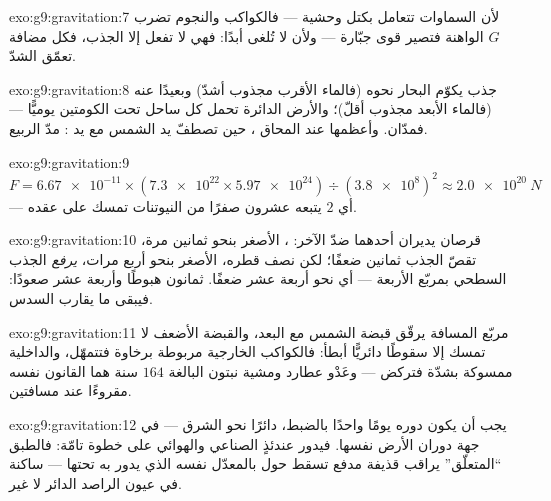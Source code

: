 \begin{solution}{exo:g9:gravitation:7}
لأن السماوات تتعامل بكتل وحشية --- فالكواكب والنجوم تضرب $G$
الواهنة فتصير قوى جبّارة --- ولأن  لا تُلغى أبدًا:
فهي لا تفعل إلا الجذب، فكل  مضافة تعمّق الشدّ.
\end{solution}

\begin{solution}{exo:g9:gravitation:8}
جذب  يكوّم البحار نحوه (فالماء الأقرب مجذوب أشدّ) وبعيدًا
عنه (فالماء الأبعد مجذوب أقلّ)؛ والأرض الدائرة تحمل كل ساحل
تحت الكومتين يوميًّا --- فمدّان. وأعظمها عند المحاق ،
حين تصطفّ يد الشمس مع يد : مدّ الربيع.
\end{solution}

\begin{solution}{exo:g9:gravitation:9}
$F = \num{6.67e-11} \times (\num{7.3e22} \times
\num{5.97e24}) \div (\num{3.8e8})^2 \approx \qty{2.0e20}{N}$
--- أي $2$ يتبعه عشرون صفرًا من النيوتنات تمسك  على
عقده.
\end{solution}

\begin{solution}{exo:g9:gravitation:10}
قرصان يديران أحدهما ضدّ الآخر:  ، الأصغر بنحو ثمانين
مرة، تقصّ الجذب ثمانين ضعفًا؛ لكن نصف قطره، الأصغر بنحو أربع
مرات، \emph{يرفع} الجذب السطحي بمربّع الأربعة --- أي نحو أربعة
عشر ضعفًا. ثمانون هبوطًا وأربعة عشر صعودًا: فيبقى ما يقارب
السدس.
\end{solution}

\begin{solution}{exo:g9:gravitation:11}
مربّع المسافة يرقّق قبضة الشمس مع البعد، والقبضة الأضعف لا
تمسك إلا سقوطًا دائريًّا أبطأ: فالكواكب الخارجية مربوطة برخاوة
فتتمهّل، والداخلية ممسوكة بشدّة فتركض --- وعَدْو عطارد ومشية
نبتون البالغة $164$ سنة هما القانون نفسه مقروءًا عند
مسافتين.
\end{solution}

\begin{solution}{exo:g9:gravitation:12}
يجب أن يكون دوره يومًا واحدًا بالضبط، دائرًا نحو الشرق --- في
جهة دوران الأرض نفسها. فيدور عندئذٍ  الصناعي والهوائي على
خطوة تامّة: فالطبق ``المتعلّق'' يراقب قذيفة مدفع تسقط حول
 بالمعدّل نفسه الذي يدور به  تحتها --- ساكنة في
عيون الراصد الدائر لا غير.
\end{solution}

